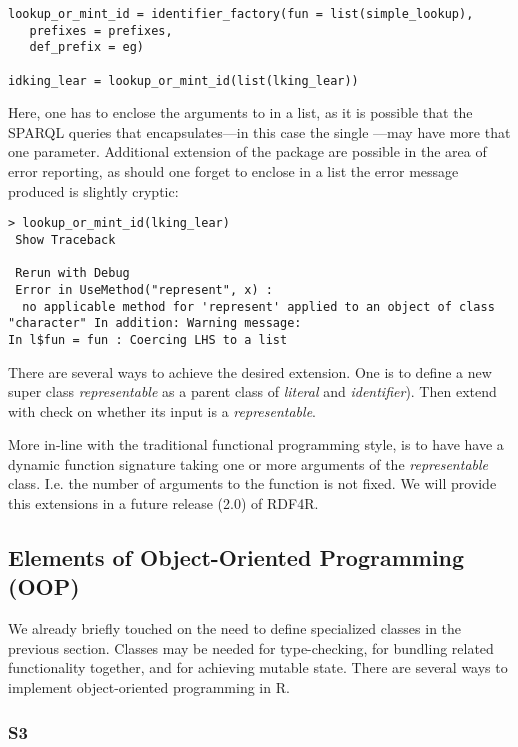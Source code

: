 \begin{lstlisting}[style=customr]
lookup_or_mint_id = identifier_factory(fun = list(simple_lookup),
   prefixes = prefixes,
   def_prefix = eg)

idking_lear = lookup_or_mint_id(list(lking_lear))
\end{lstlisting}

Here, one has to enclose the arguments to  in a list, as it is possible that the SPARQL queries that  encapsulates---in this case the single ---may have more that one parameter. Additional extension of the package are possible in the area of error reporting, as should one forget to enclose  in a list the error message produced is slightly cryptic:

\begin{lstlisting}[style=customr]
> lookup_or_mint_id(lking_lear)
 Show Traceback
 
 Rerun with Debug
 Error in UseMethod("represent", x) : 
  no applicable method for 'represent' applied to an object of class "character" In addition: Warning message:
In l$fun = fun : Coercing LHS to a list
\end{lstlisting}

There are several ways to achieve the desired extension. One is to define a new super class \emph{representable} as a parent class of \emph{literal} and \emph{identifier}). Then extend  with check on whether its input is a \emph{representable}.

More in-line with the traditional functional programming style, is to have  have a dynamic function signature taking one or more arguments of the \emph{representable} class. I.e. the number of arguments to the function is not fixed. We will provide this extensions in a future release (2.0) of RDF4R.

\subsection{Elements of Object-Oriented Programming (OOP)}

We already briefly touched on the need to define specialized classes in the previous section. Classes may be needed for type-checking, for bundling related functionality together, and for achieving mutable state. There are several ways to implement object-oriented programming in R.

\subsubsection{S3}

